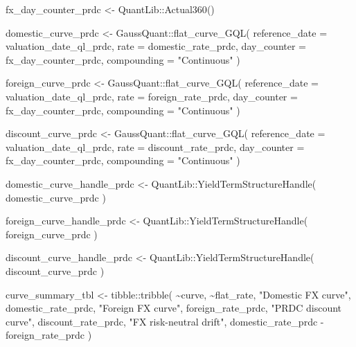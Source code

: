 \documentclass[
  letterpaper,
  DIV=11,
  numbers=noendperiod]{scrreprt}
\newenvironment{Shaded}{\begin{snugshade}}{\end{snugshade}}
\newcommand{\AttributeTok}[1]{\textcolor[rgb]{0.40,0.45,0.13}{#1}}
\newcommand{\FunctionTok}[1]{\textcolor[rgb]{0.28,0.35,0.67}{#1}}
\newcommand{\NormalTok}[1]{\textcolor[rgb]{0.00,0.23,0.31}{#1}}
\newcommand{\OtherTok}[1]{\textcolor[rgb]{0.00,0.23,0.31}{#1}}
\newcommand{\SpecialCharTok}[1]{\textcolor[rgb]{0.37,0.37,0.37}{#1}}
\newcommand{\StringTok}[1]{\textcolor[rgb]{0.13,0.47,0.30}{#1}}
\begin{document}
\begin{Shaded}
\begin{Highlighting}[]
\NormalTok{fx\_day\_counter\_prdc }\OtherTok{\textless{}{-}}\NormalTok{ QuantLib}\SpecialCharTok{::}\FunctionTok{Actual360}\NormalTok{()}

\NormalTok{domestic\_curve\_prdc }\OtherTok{\textless{}{-}}\NormalTok{ GaussQuant}\SpecialCharTok{::}\FunctionTok{flat\_curve\_GQL}\NormalTok{(}
  \AttributeTok{reference\_date =}\NormalTok{ valuation\_date\_ql\_prdc,}
  \AttributeTok{rate =}\NormalTok{ domestic\_rate\_prdc,}
  \AttributeTok{day\_counter =}\NormalTok{ fx\_day\_counter\_prdc,}
  \AttributeTok{compounding =} \StringTok{"Continuous"}
\NormalTok{)}

\NormalTok{foreign\_curve\_prdc }\OtherTok{\textless{}{-}}\NormalTok{ GaussQuant}\SpecialCharTok{::}\FunctionTok{flat\_curve\_GQL}\NormalTok{(}
  \AttributeTok{reference\_date =}\NormalTok{ valuation\_date\_ql\_prdc,}
  \AttributeTok{rate =}\NormalTok{ foreign\_rate\_prdc,}
  \AttributeTok{day\_counter =}\NormalTok{ fx\_day\_counter\_prdc,}
  \AttributeTok{compounding =} \StringTok{"Continuous"}
\NormalTok{)}

\NormalTok{discount\_curve\_prdc }\OtherTok{\textless{}{-}}\NormalTok{ GaussQuant}\SpecialCharTok{::}\FunctionTok{flat\_curve\_GQL}\NormalTok{(}
  \AttributeTok{reference\_date =}\NormalTok{ valuation\_date\_ql\_prdc,}
  \AttributeTok{rate =}\NormalTok{ discount\_rate\_prdc,}
  \AttributeTok{day\_counter =}\NormalTok{ fx\_day\_counter\_prdc,}
  \AttributeTok{compounding =} \StringTok{"Continuous"}
\NormalTok{)}

\NormalTok{domestic\_curve\_handle\_prdc }\OtherTok{\textless{}{-}}\NormalTok{ QuantLib}\SpecialCharTok{::}\FunctionTok{YieldTermStructureHandle}\NormalTok{(}
\NormalTok{  domestic\_curve\_prdc}
\NormalTok{)}

\NormalTok{foreign\_curve\_handle\_prdc }\OtherTok{\textless{}{-}}\NormalTok{ QuantLib}\SpecialCharTok{::}\FunctionTok{YieldTermStructureHandle}\NormalTok{(}
\NormalTok{  foreign\_curve\_prdc}
\NormalTok{)}

\NormalTok{discount\_curve\_handle\_prdc }\OtherTok{\textless{}{-}}\NormalTok{ QuantLib}\SpecialCharTok{::}\FunctionTok{YieldTermStructureHandle}\NormalTok{(}
\NormalTok{  discount\_curve\_prdc}
\NormalTok{)}

\NormalTok{curve\_summary\_tbl }\OtherTok{\textless{}{-}}\NormalTok{ tibble}\SpecialCharTok{::}\FunctionTok{tribble}\NormalTok{(}
  \SpecialCharTok{\textasciitilde{}}\NormalTok{curve,                 }\SpecialCharTok{\textasciitilde{}}\NormalTok{flat\_rate,}
  \StringTok{"Domestic FX curve"}\NormalTok{,     domestic\_rate\_prdc,}
  \StringTok{"Foreign FX curve"}\NormalTok{,      foreign\_rate\_prdc,}
  \StringTok{"PRDC discount curve"}\NormalTok{,   discount\_rate\_prdc,}
  \StringTok{"FX risk{-}neutral drift"}\NormalTok{, domestic\_rate\_prdc }\SpecialCharTok{{-}}
\NormalTok{                             foreign\_rate\_prdc}
\NormalTok{)}


\end{Highlighting}
\end{Shaded}
\end{document}
